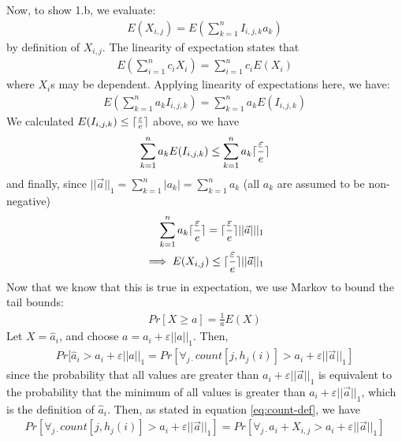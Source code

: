 \documentclass[11pt]{article}
\DeclarePairedDelimiter\ceil{\lceil}{\rceil}
\begin{document}
Now, to show 1.b, we evaluate:
\begin{align}
    E(X_{i, j}) = E\left(\sum_{k = 1}^n I_{i, j, k} a_k\right) 
\end{align}
by definition of $X_{i, j}$. The linearity of expectation states that
\begin{align}
    E(\sum_{i = 1}^{n} c_i X_i) = \sum_{i = 1}^{n} c_i E(X_i)
\end{align}
where $X_i$s may be dependent. Applying linearity of expectations here, we have:
\begin{align}
    E(\sum_{k = 1}^{n} a_k I_{i, j, k}) = \sum_{k = 1}^{n} a_k E(I_{i, j, k}) 
\end{align}
We calculated $E(I_{i, j, k}) \leq \ceil{\frac{\varepsilon}{e}}$ above, so 
we have
\begin{align}
    \sum_{k = 1}^{n} a_k E(I_{i, j, k})  \leq\sum_{k = 1}^{n} a_k \ceil{\frac{\varepsilon}{e}}
\end{align}
and finally, since $||\vec{a}||_1 = \sum_{k = 1}^{n} |a_k| = \sum_{k = 1}^{n} a_k$
(all $a_k$ are assumed to be non-negative)
\begin{align}
    \sum_{k = 1}^{n} a_k \ceil{\frac{\varepsilon}{e}} = \ceil{\frac{\varepsilon}{e}} ||\vec{a}|||_1 \\
    \implies E(X_{i, j}) \leq \ceil{\frac{\varepsilon}{e}} ||\vec{a}||_1
\end{align}
Now that we know that this is true in expectation, we use Markov to bound the tail bounds:
\begin{align}
    Pr[X \geq a] = \frac{1}{a}E(X) 
\end{align}
Let $X = \hat{a}_i$, and choose $a = a_i + \varepsilon||a||_1$.  Then,
\begin{align}
    Pr[\hat{a}_i > a_i + \varepsilon ||a||_1 = Pr[\forall_{j \cdot} count[j, h_j(i)] > a_i + \varepsilon ||\vec{a}||_1] 
\end{align}
since the probability that all values are greater than $a_i + \varepsilon||\vec a||_1$ is equivalent 
to the probability that the minimum of all values is greater than $a_i + \varepsilon||\vec a||_1$,
which is the definition of $\hat a_i$. Then, as stated in equation \ref{eq:count-def}, we have
\begin{align}
    Pr[\forall_{j \cdot} count[j, h_j(i)] > a_i + \varepsilon ||\vec{a}||_1] = Pr[\forall_{j \cdot} a_i + X_{i, j} > a_i + \varepsilon ||\vec{a}||_1]
\end{align}
\end{document}

